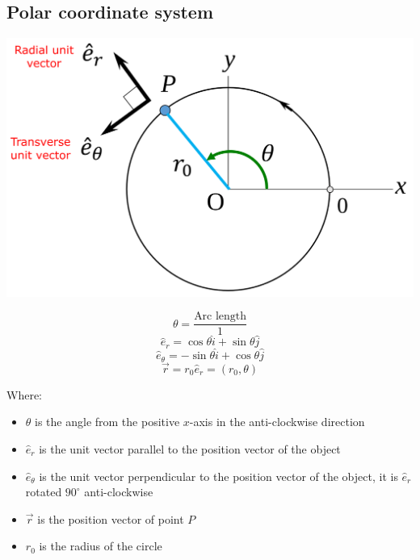 \documentclass[11pt]{article}
\begin{document}
\subsection{Polar coordinate system}
\label{sec:org7be5210}
\begin{center}
\includegraphics[width=.9\linewidth]{./images/polar-coordinates.png}
\end{center}
\[\theta = \frac{\text{Arc length}}{1}\]
\[\hat{e}_r = \cos \theta \hat{i} + \sin \theta \hat{j}\]
\[\hat{e}_{\theta} = - \sin \theta \hat{i} + \cos \theta \hat{j}\]
\[\vec{r} = r_0 \hat{e}_r = (r_0, \theta)\]

Where:
\begin{itemize}
\item \(\theta\) is the angle from the positive \(x\)-axis in the anti-clockwise direction
\item \(\hat{e}_r\) is the unit vector parallel to the position vector of the object
\item \(\hat{e}_{\theta}\) is the unit vector perpendicular to the position vector of the object, it is \(\hat{e}_r\) rotated \(90^{\circ}\) anti-clockwise
\item \(\vec{r}\) is the position vector of point \(P\)
\item \(r_0\) is the radius of the circle
\end{itemize}
\end{document}
